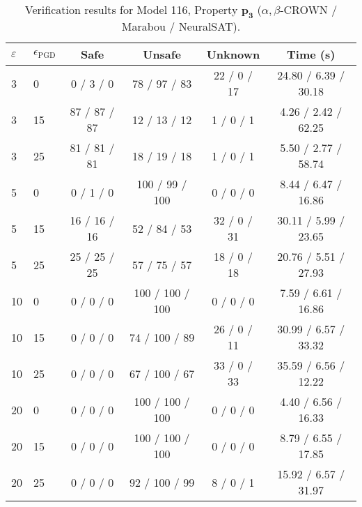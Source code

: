 \begin{table}[htbp]\centering
\caption{\small Verification results for Model 116, Property $\mathbf{p_{3}}$ ($\alpha,\beta$-CROWN / Marabou / NeuralSAT).}
\label{tab:model116_p3}
\begin{tabular}{llcccc}
\toprule
$\varepsilon$ & $\epsilon_{\scriptscriptstyle\mathrm{PGD}}$ & Safe & Unsafe & Unknown & Time (s) \\
\midrule
3 & 0 & 0 / 3 / 0 & 78 / 97 / 83 & 22 / 0 / 17 & 24.80 / 6.39 / 30.18 \\
3 & 15 & 87 / 87 / 87 & 12 / 13 / 12 & 1 / 0 / 1 & 4.26 / 2.42 / 62.25 \\
3 & 25 & 81 / 81 / 81 & 18 / 19 / 18 & 1 / 0 / 1 & 5.50 / 2.77 / 58.74 \\
5 & 0 & 0 / 1 / 0 & 100 / 99 / 100 & 0 / 0 / 0 & 8.44 / 6.47 / 16.86 \\
5 & 15 & 16 / 16 / 16 & 52 / 84 / 53 & 32 / 0 / 31 & 30.11 / 5.99 / 23.65 \\
5 & 25 & 25 / 25 / 25 & 57 / 75 / 57 & 18 / 0 / 18 & 20.76 / 5.51 / 27.93 \\
10 & 0 & 0 / 0 / 0 & 100 / 100 / 100 & 0 / 0 / 0 & 7.59 / 6.61 / 16.86 \\
10 & 15 & 0 / 0 / 0 & 74 / 100 / 89 & 26 / 0 / 11 & 30.99 / 6.57 / 33.32 \\
10 & 25 & 0 / 0 / 0 & 67 / 100 / 67 & 33 / 0 / 33 & 35.59 / 6.56 / 12.22 \\
20 & 0 & 0 / 0 / 0 & 100 / 100 / 100 & 0 / 0 / 0 & 4.40 / 6.56 / 16.33 \\
20 & 15 & 0 / 0 / 0 & 100 / 100 / 100 & 0 / 0 / 0 & 8.79 / 6.55 / 17.85 \\
20 & 25 & 0 / 0 / 0 & 92 / 100 / 99 & 8 / 0 / 1 & 15.92 / 6.57 / 31.97 \\
\bottomrule
\end{tabular}
\end{table}
